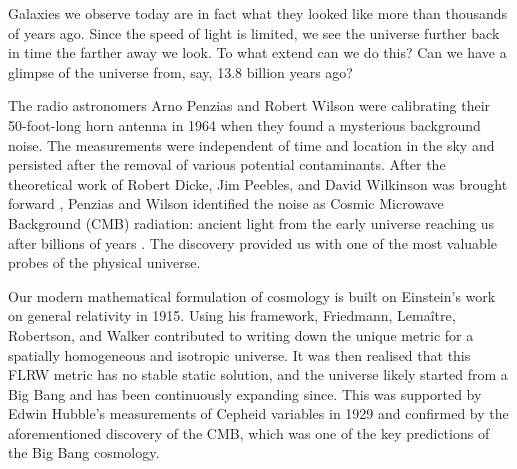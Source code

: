 %
%
%
%
%
%
%
%
%
%
%
%

Galaxies we observe today are in fact what they looked like more than thousands of years ago. Since the speed of light is limited, we see the universe further back in time the farther away we look. To what extend can we do this? Can we have a glimpse of the universe from, say, 13.8 billion years ago?

The radio astronomers Arno Penzias and Robert Wilson were calibrating their 50-foot-long horn antenna in 1964 when they found a mysterious background noise. The measurements were independent of time and location in the sky and persisted after the removal of various potential contaminants. After the theoretical work of Robert Dicke, Jim Peebles, and David Wilkinson was brought forward \cite{Dicke1965}, Penzias and Wilson identified the noise as Cosmic Microwave Background (CMB) radiation: ancient light from the early universe reaching us after billions of years \cite{Penzias1965}. The discovery provided us with one of the most valuable probes of the physical universe. %

Our modern mathematical formulation of cosmology is built on Einstein's work on general relativity in 1915. Using his framework, Friedmann, Lemaître, Robertson, and Walker contributed to writing down the unique metric for a spatially homogeneous and isotropic universe.  It was then realised that this FLRW metric has no stable static solution, and the universe likely started from a Big Bang and has been continuously expanding since. This was supported by Edwin Hubble's measurements of Cepheid variables in 1929 and confirmed by the aforementioned discovery of the CMB, which was one of the key predictions of the Big Bang cosmology.

